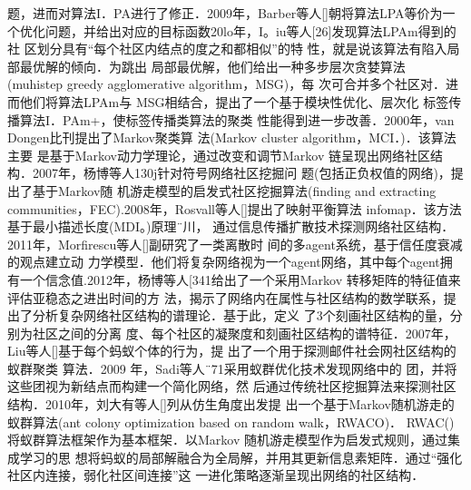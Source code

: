 题，进而对算法I．PA进行了修正．2009年，Barber等人[]朝将算法LPA等价为一
个优化问题，并给出对应的目标函数20lo年，I。iu等人[26]发现算法LPAm得到的社
区划分具有“每个社区内结点的度之和都相似”的特
性，就是说该算法有陷入局部最优解的倾向．为跳出
局部最优解，他们给出一种多步层次贪婪算法
(muhistep greedy agglomerative algorithm，MSG)，每
次可合并多个社区对．进而他们将算法LPAm与
MSG相结合，提出了一个基于模块性优化、层次化
标签传播算法I．PAm+，使标签传播类算法的聚类
性能得到进一步改善．2000年，van Dongen比刊提出了Markov聚类算
法(Markov cluster algorithm，MCI．)．该算法主要
是基于Markov动力学理论，通过改变和调节Markov
链呈现出网络社区结构．2007年，杨博等人130j针对符号网络社区挖掘问
题(包括正负权值的网络)，提出了基于Markov随
机游走模型的启发式社区挖掘算法(finding and
extracting communities，FEC).2008年，Rosvall等人[]提出了映射平衡算法
infomap．该方法基于最小描述长度(MDI。)原理¨川，
通过信息传播扩散技术探测网络社区结构．2011年，Morfirescu等人[]副研究了一类离散时
间的多agent系统，基于信任度衰减的观点建立动
力学模型．他们将复杂网络视为一个agent网络，其中每个agent拥有一个信念值.2012年，杨博等人[341给出了一个采用Markov
转移矩阵的特征值来评估亚稳态之进出时间的方
法，揭示了网络内在属性与社区结构的数学联系，提
出了分析复杂网络社区结构的谱理论．基于此，定义
了3个刻画社区结构的量，分别为社区之间的分离
度、每个社区的凝聚度和刻画社区结构的谱特征．2007年，Liu等人[]基于每个蚂蚁个体的行为，提
出了一个用于探测邮件社会网社区结构的蚁群聚类
算法．2009
年，Sadi等人¨71采用蚁群优化技术发现网络中的
团，并将这些团视为新结点而构建一个简化网络，然
后通过传统社区挖掘算法来探测社区结构．2010年，刘大有等人[]列从仿生角度出发提
出一个基于Markov随机游走的蚁群算法(ant colony
optimization based on random walk，RWACO)．
RWAC()将蚁群算法框架作为基本框架．以Markov
随机游走模型作为启发式规则，通过集成学习的思
想将蚂蚁的局部解融合为全局解，并用其更新信息素矩阵．通过“强化社区内连接，弱化社区间连接”这
一进化策略逐渐呈现出网络的社区结构．
			